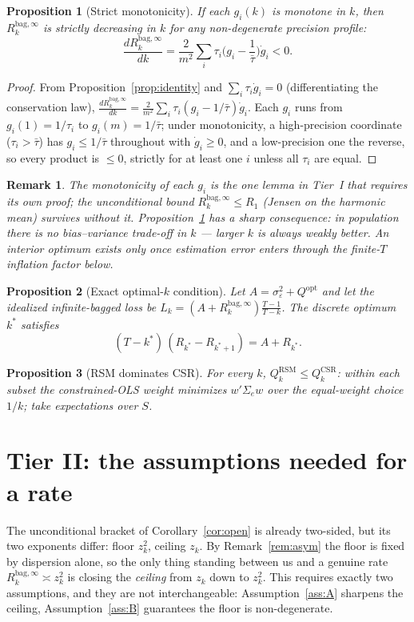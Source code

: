 \documentclass[11pt]{article}
\newcommand{\Sig}{\Sigma_e}
\newcommand{\Rk}{R_k^{\mathrm{bag},\infty}}
\newcommand{\Qopt}{Q^{\mathrm{opt}}}
\newtheorem{proposition}{Proposition}
\newtheorem{remark}{Remark}
\begin{document}
\begin{proposition}[Strict monotonicity]\label{prop:mono}
If each $g_i(k)$ is monotone in $k$, then $\Rk$ is strictly decreasing in $k$ for any
non-degenerate precision profile:
\[
  \frac{d\Rk}{dk}=\frac{2}{m^2}\sum_i\tau_i\Big(g_i-\frac1{\bar\tau}\Big)\dot g_i<0 .
\]
\end{proposition}
\begin{proof}
From Proposition~\ref{prop:identity} and $\sum_i\tau_i\dot g_i=0$ (differentiating the
conservation law), $\frac{d\Rk}{dk}=\frac2{m^2}\sum_i\tau_i(g_i-1/\bar\tau)\dot g_i$.
Each $g_i$ runs from $g_i(1)=1/\tau_i$ to $g_i(m)=1/\bar\tau$; under monotonicity, a
high-precision coordinate ($\tau_i>\bar\tau$) has $g_i\le1/\bar\tau$ throughout with
$\dot g_i\ge0$, and a low-precision one the reverse, so every product is $\le0$, strictly
for at least one $i$ unless all $\tau_i$ are equal.
\end{proof}
\begin{remark}
The monotonicity of each $g_i$ is the one lemma in Tier~I that requires its own proof;
the unconditional bound $\Rk\le R_1$ (Jensen on the harmonic mean) survives without it.
Proposition~\ref{prop:mono} has a sharp consequence: \emph{in population there is no
bias--variance trade-off in $k$} --- larger $k$ is always weakly better. An interior
optimum exists \emph{only} once estimation error enters through the finite-$T$ inflation
factor below.
\end{remark}

\begin{proposition}[Exact optimal-$k$ condition]\label{prop:foc}
Let $A=\sigma_\varepsilon^2+\Qopt$ and let the idealized infinite-bagged loss be
$L_k=(A+\Rk)\frac{T-1}{T-k}$. The discrete optimum $k^\ast$ satisfies
\[
  (T-k^\ast)\,(R_{k^\ast}-R_{k^\ast+1})=A+R_{k^\ast}.
\]
\end{proposition}

\begin{proposition}[RSM dominates CSR]\label{prop:csr}
For every $k$, $Q_k^{\mathrm{RSM}}\le Q_k^{\mathrm{CSR}}$: within each subset the
constrained-OLS weight minimizes $w'\Sig w$ over the equal-weight choice $1/k$; take
expectations over $S$.
\end{proposition}

\section{Tier II: the assumptions needed for a rate}
The unconditional bracket of Corollary~\ref{cor:open} is already two-sided, but its two
exponents differ: floor $z_k^2$, ceiling $z_k$. By Remark~\ref{rem:asym} the floor is
fixed by dispersion alone, so the only thing standing between us and a genuine rate
$\Rk\asymp z_k^2$ is closing the \emph{ceiling} from $z_k$ down to $z_k^2$. This requires
exactly two assumptions, and they are not interchangeable: Assumption~\ref{ass:A}
sharpens the ceiling, Assumption~\ref{ass:B} guarantees the floor is non-degenerate.
\end{document}
